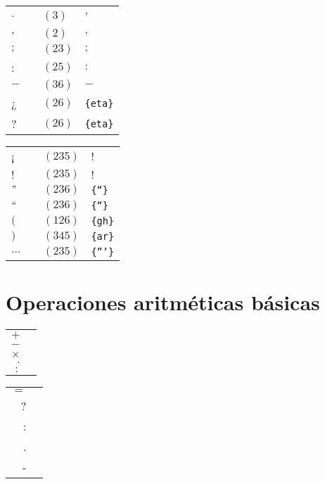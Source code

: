 \documentclass[draft]{article}
\newcommand{\mytable}[1]{%
    \enskip\begin{tabular}[t]{r|l} 
    \hline #1 \hline
    \end{tabular}\enskip}
\newcommand{\myagtable}[1]{%
	\enskip\begin{tabular}[t]{l|r|l|l} 
		\hline #1 \hline
	\end{tabular}\enskip}
\begin{document}
\begin{center}
	\myagtable{
		$.$    &\braille{'}      & $(3)$  & '                  \\
		$,$    &\braille{,}      & $(2)$  & $,$                \\
		$;$    &\braille{;}      & $(23)$ & $;$                \\
		:      &\braille{:}      & $(25)$ & $:$                \\
		$-$    &\braille{-}      & $(36)$ & $-$                \\
		¿      &\braille{{en}}   & $(26)$ & \texttt{\{eta\}}   \\
		?      &\braille{{en}}   & $(26)$ & \texttt{\{eta\}}   \\	
	}
	\myagtable{
		¡      &\braille{!}      & $(235)$  & $!$\\
		$!$    &\braille{!}      & $(235)$  & $!$\\
		$"$    &\braille{{``}}   & $(236)$  & \texttt{\{``\}}  \\
		$``$   &\braille{{``}}   & $(236)$  & \texttt{\{``\}}  \\
		$($    &\braille{{gh}}   & $(126)$  & \texttt{\{gh\}}  \\
		$)$    &\braille{{ar}}   & $(345)$  & \texttt{\{ar\}}  \\
		$\dots$&\braille{'''}    & $(235)$  & \texttt{\{'''\}} \\
	}
\end{center}


\section{Operaciones aritméticas básicas}

\begin{center}
	\mytable{
		$+$&\braille{!} \\
		$-$&\braille{-} \\
		$\times$&\braille{{``}}    \\
		$.$&\braille{.}    \\
		$:$&\braille{.}    \\
	}
	\mytable{
		$=$&\braille{=} \\
		?&\braille{?} \\
		:&\braille{:}    \\
		.&\braille{.}    \\
		-&\braille{-} \\
	}
\end{center}
\end{document}
